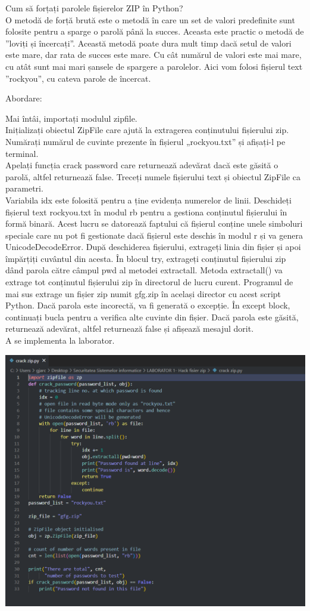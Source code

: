 \documentclass[oneside,20pt]{article}          %
\begin{document}
Cum să forțați parolele fișierelor ZIP în Python?\\
O metodă de forță brută este o metodă în care un set de valori predefinite sunt folosite pentru a sparge o parolă până la succes. Aceasta este practic o metodă de ”loviți și încercați”. Această metodă poate dura mult timp dacă setul de valori este mare, dar rata de succes este mare. Cu cât numărul de valori este mai mare, cu atât sunt mai mari șansele de spargere a parolelor. Aici vom folosi fișierul text ”rockyou”, cu cateva parole de încercat.

Abordare:  

Mai întâi, importați modulul zipfile.\\
Inițializați obiectul ZipFile care ajută la extragerea conținutului fișierului zip.\\
Numărați numărul de cuvinte prezente în fișierul „rockyou.txt” și afișați-l pe terminal.\\
Apelați funcția crack password care returnează adevărat dacă este găsită o parolă, altfel returnează false. Treceți numele fișierului text și obiectul ZipFile ca parametri.\\
Variabila idx este folosită pentru a ține evidența numerelor de linii.
Deschideți fișierul text rockyou.txt în modul rb pentru a gestiona conținutul fișierului în formă binară. Acest lucru se datorează faptului că fișierul conține unele simboluri speciale care nu pot fi gestionate dacă fișierul este deschis în modul r și va genera UnicodeDecodeError.
După deschiderea fișierului, extrageți linia din fișier și apoi împărțiți cuvântul din acesta.
În blocul try, extrageți conținutul fișierului zip dând parola către câmpul pwd al metodei extractall. Metoda extractall() va extrage tot conținutul fișierului zip în directorul de lucru curent. Programul de mai sus extrage un fișier zip numit gfg.zip în același director cu acest script Python.
Dacă parola este incorectă, va fi generată o excepție. În except block, continuați bucla pentru a verifica alte cuvinte din fișier.
Dacă parola este găsită, returnează adevărat, altfel returnează false și afișează mesajul dorit.\\ 
A se implementa la laborator.
\begin{center}
\includegraphics[height=5 cm]{11.png}
\end{center}
\end{document}
